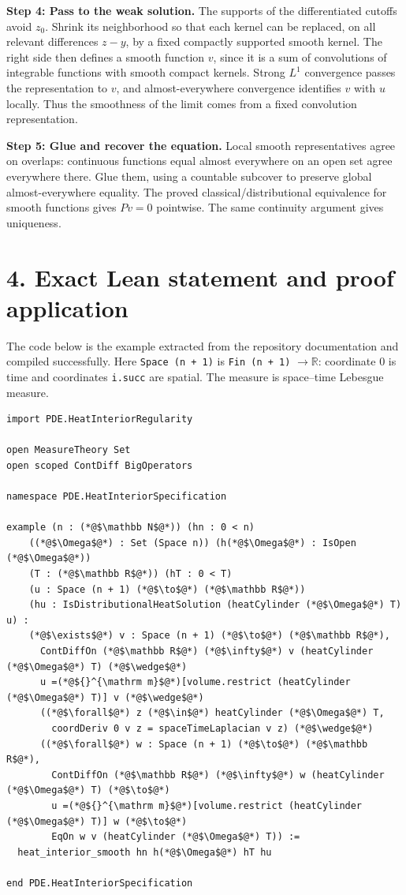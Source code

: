 \documentclass[11pt,letterpaper]{article}
\newcommand{\R}{\mathbb R}
\begin{document}
\textbf{Step 4: Pass to the weak solution.}
The supports of the differentiated cutoffs avoid $z_0$. Shrink its neighborhood
so that each kernel can be replaced, on all relevant differences $z-y$, by a
fixed compactly supported smooth kernel. The right side then defines a smooth
function $v$, since it is a sum of convolutions of integrable functions with
smooth compact kernels. Strong $L^1$ convergence passes the representation to
$v$, and almost-everywhere convergence identifies $v$ with $u$ locally.
Thus the smoothness of the limit comes from a fixed convolution representation.

\textbf{Step 5: Glue and recover the equation.}
Local smooth representatives agree on overlaps: continuous functions equal
almost everywhere on an open set agree everywhere there. Glue them, using a
countable subcover to preserve global almost-everywhere equality. The proved
classical/distributional equivalence for smooth functions gives $Pv=0$
pointwise. The same continuity argument gives uniqueness.

\newpage
\section*{4. Exact Lean statement and proof application}
The code below is the example extracted from the repository documentation and
compiled successfully. Here \texttt{Space (n + 1)} is
\texttt{Fin (n + 1)} $\to\R$: coordinate $0$ is time and coordinates
\texttt{i.succ} are spatial. The measure is space--time Lebesgue measure.

\begin{lstlisting}
import PDE.HeatInteriorRegularity

open MeasureTheory Set
open scoped ContDiff BigOperators

namespace PDE.HeatInteriorSpecification

example (n : (*@$\mathbb N$@*)) (hn : 0 < n)
    ((*@$\Omega$@*) : Set (Space n)) (h(*@$\Omega$@*) : IsOpen (*@$\Omega$@*))
    (T : (*@$\mathbb R$@*)) (hT : 0 < T)
    (u : Space (n + 1) (*@$\to$@*) (*@$\mathbb R$@*))
    (hu : IsDistributionalHeatSolution (heatCylinder (*@$\Omega$@*) T) u) :
    (*@$\exists$@*) v : Space (n + 1) (*@$\to$@*) (*@$\mathbb R$@*),
      ContDiffOn (*@$\mathbb R$@*) (*@$\infty$@*) v (heatCylinder (*@$\Omega$@*) T) (*@$\wedge$@*)
      u =(*@${}^{\mathrm m}$@*)[volume.restrict (heatCylinder (*@$\Omega$@*) T)] v (*@$\wedge$@*)
      ((*@$\forall$@*) z (*@$\in$@*) heatCylinder (*@$\Omega$@*) T,
        coordDeriv 0 v z = spaceTimeLaplacian v z) (*@$\wedge$@*)
      ((*@$\forall$@*) w : Space (n + 1) (*@$\to$@*) (*@$\mathbb R$@*),
        ContDiffOn (*@$\mathbb R$@*) (*@$\infty$@*) w (heatCylinder (*@$\Omega$@*) T) (*@$\to$@*)
        u =(*@${}^{\mathrm m}$@*)[volume.restrict (heatCylinder (*@$\Omega$@*) T)] w (*@$\to$@*)
        EqOn w v (heatCylinder (*@$\Omega$@*) T)) :=
  heat_interior_smooth hn h(*@$\Omega$@*) hT hu

end PDE.HeatInteriorSpecification
\end{lstlisting}
\end{document}

